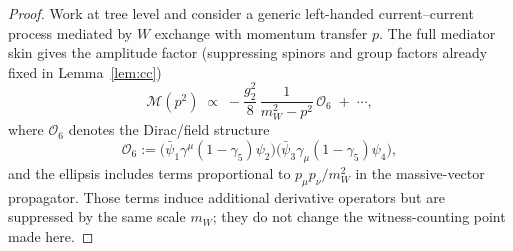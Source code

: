 \documentclass[11pt]{article}
\theoremstyle{remark}
\begin{document}
\begin{proof}
Work at tree level and consider a generic left-handed current--current process mediated by $W$
exchange with momentum transfer $p$.
The full mediator skin gives the amplitude factor (suppressing spinors and group factors already fixed
in Lemma~\ref{lem:cc})
\begin{equation}\label{eq:cc-prop-factor}
\mathcal{M}(p^2)\;\propto\; -\frac{g_2^2}{8}\,\frac{1}{m_W^2-p^2}\,\mathcal{O}_6 \;+\;\cdots ,
\end{equation}
where $\mathcal{O}_6$ denotes the Dirac/field structure
\[
\mathcal{O}_6 :=
\big(\bar\psi_1\gamma^\mu(1-\gamma_5)\psi_2\big)\big(\bar\psi_3\gamma_\mu(1-\gamma_5)\psi_4\big),
\]
and the ellipsis includes terms proportional to $p_\mu p_\nu/m_W^2$ in the massive-vector propagator.
Those terms induce additional derivative operators but are suppressed by the same scale $m_W$; they do
not change the witness-counting point made here.


\end{proof}
\end{document}
